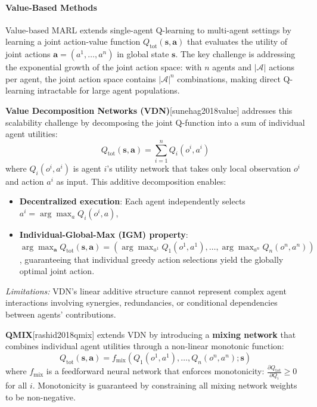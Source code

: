 \paragraph{Value-Based Methods}
\label{sec:marl_value_based}

Value-based MARL extends single-agent Q-learning to multi-agent settings by learning a joint action-value function $Q_{\text{tot}}(\mathbf{s}, \mathbf{a})$ that evaluates the utility of joint actions $\mathbf{a} = (a^1, \ldots, a^n)$ in global state $\mathbf{s}$. The key challenge is addressing the exponential growth of the joint action space: with $n$ agents and $|\mathcal{A}|$ actions per agent, the joint action space contains $|\mathcal{A}|^n$ combinations, making direct Q-learning intractable for large agent populations.

\textbf{Value Decomposition Networks (VDN)}[sunehag2018value] addresses this scalability challenge by decomposing the joint Q-function into a sum of individual agent utilities:
\[
Q_{\text{tot}}(\mathbf{s}, \mathbf{a}) = \sum_{i=1}^{n} Q_i(o^i, a^i)
\]
where $Q_i(o^i, a^i)$ is agent $i$'s utility network that takes only local observation $o^i$ and action $a^i$ as input. This additive decomposition enables:
\begin{itemize}
    \item \textbf{Decentralized execution}: Each agent independently selects $a^i = \arg\max_{a} Q_i(o^i, a)$,
    \item \textbf{Individual-Global-Max (IGM) property}: $\arg\max_{\mathbf{a}} Q_{\text{tot}}(\mathbf{s}, \mathbf{a}) = (\arg\max_{a^1} Q_1(o^1, a^1), \ldots, \arg\max_{a^n} Q_n(o^n, a^n))$, guaranteeing that individual greedy action selections yield the globally optimal joint action.
\end{itemize}

\textit{Limitations:} VDN's linear additive structure cannot represent complex agent interactions involving synergies, redundancies, or conditional dependencies between agents' contributions.

\textbf{QMIX}[rashid2018qmix] extends VDN by introducing a \textbf{mixing network} that combines individual agent utilities through a non-linear monotonic function:
\[
Q_{\text{tot}}(\mathbf{s}, \mathbf{a}) = f_{\text{mix}}(Q_1(o^1, a^1), \ldots, Q_n(o^n, a^n); \mathbf{s})
\]
where $f_{\text{mix}}$ is a feedforward neural network that enforces monotonicity: $\frac{\partial Q_{\text{tot}}}{\partial Q_i} \geq 0$ for all $i$. Monotonicity is guaranteed by constraining all mixing network weights to be non-negative.

